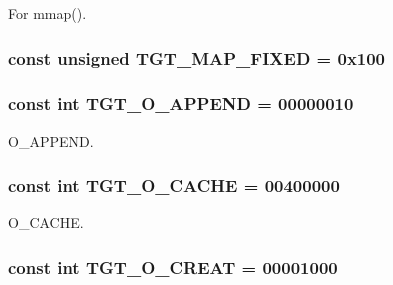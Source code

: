 For mmap(). \hypertarget{classAlphaLinux_a0124e421d7846143bca15728b7a53e14}{
\subsubsection[{TGT\_\-MAP\_\-FIXED}]{\setlength{\rightskip}{0pt plus 5cm}const unsigned {\bf TGT\_\-MAP\_\-FIXED} = 0x100}}
\label{classAlphaLinux_a0124e421d7846143bca15728b7a53e14}
\hypertarget{classAlphaLinux_af11adc5404ea3780a5ce2829cc3710b7}{
\subsubsection[{TGT\_\-O\_\-APPEND}]{\setlength{\rightskip}{0pt plus 5cm}const int {\bf TGT\_\-O\_\-APPEND} = 00000010}}
\label{classAlphaLinux_af11adc5404ea3780a5ce2829cc3710b7}


O\_\-APPEND. \hypertarget{classAlphaLinux_ab30a547e309825ec5f9c5d11a6da543c}{
\subsubsection[{TGT\_\-O\_\-CACHE}]{\setlength{\rightskip}{0pt plus 5cm}const int {\bf TGT\_\-O\_\-CACHE} = 00400000}}
\label{classAlphaLinux_ab30a547e309825ec5f9c5d11a6da543c}


O\_\-CACHE. \hypertarget{classAlphaLinux_aec02e04ca367e6c3f4b46e4edc12efac}{
\subsubsection[{TGT\_\-O\_\-CREAT}]{\setlength{\rightskip}{0pt plus 5cm}const int {\bf TGT\_\-O\_\-CREAT} = 00001000}}
\label{classAlphaLinux_aec02e04ca367e6c3f4b46e4edc12efac}


